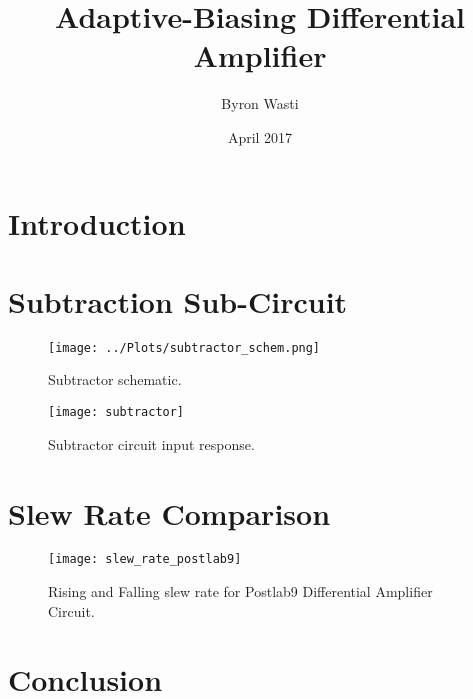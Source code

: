 \documentclass{article}
\title{Adaptive-Biasing Differential Amplifier}
\author{Byron Wasti}
\date{April 2017}
\begin{document}
\maketitle

\section{Introduction}

\section{Subtraction Sub-Circuit}

\begin{figure}[ht!]
    \centering
    \texttt{[image: ../Plots/subtractor\_schem.png]}
    \caption{Subtractor schematic.}
    \label{fig:postlab9}
\end{figure}

\begin{figure}[ht!]
    \centering
    \texttt{[image: subtractor]}
    \caption{Subtractor circuit input response.}
    \label{fig:postlab9}
\end{figure}


\section{Slew Rate Comparison}


\begin{figure}[ht!]
    \centering
    \texttt{[image: slew\_rate\_postlab9]}
    \caption{Rising and Falling slew rate for Postlab9 Differential Amplifier Circuit.}
    \label{fig:postlab9}
\end{figure}

\section{Conclusion}
\end{document}
